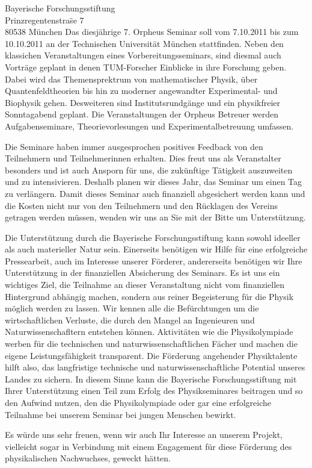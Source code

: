 \documentclass[../style/orpheus,fontsize=11pt]{scrlttr2}
\begin{document}
\begin{letter}{
\noindent Bayerische Forschungsstiftung \\
Prinzregentenstra\"se 7\\
80538 M\"unchen
}
Das diesj\"ahrige 7. Orpheus Seminar soll vom 7.10.2011 bis zum 10.10.2011 an der Technischen Universit\"at M\"unchen stattfinden. Neben den klassichen Veranstaltungen eines Vorbereitungsseminars, sind diesmal auch Vortr\"age geplant in denen TUM-Forscher Einblicke in ihre Forschung geben. Dabei wird das Themensprektrum von mathematischer Physik, \"uber Quantenfeldtheorien bis hin zu moderner angewandter Experimental- und Biophysik gehen.  Desweiteren sind Institutsrundg\"ange und ein physikfreier Sonntagabend geplant.  Die Veranstaltungen der Orpheus Betreuer werden Aufgabenseminare, Theorievorlesungen und Experimentalbetreuung umfassen.  

Die Seminare haben immer ausgesprochen positives Feedback von den Teilnehmern und Teilnehmerinnen erhalten.  Dies freut uns als Veranstalter besonders und ist auch Ansporn f\"ur uns, die zuk\"unftige T\"atigkeit auszuweiten und zu intensivieren.  Deshalb planen wir dieses Jahr, das Seminar um einen Tag zu verl\"angern.  Damit dieses Seminar auch finanziell abgesichert werden kann und die Kosten nicht nur von den Teilnehmern und den R\"ucklagen des Vereins getragen werden m\"ussen, wenden wir uns an Sie mit der Bitte um Unterst\"utzung.

Die Unterst\"utzung durch die Bayerische Forschungsstiftung kann sowohl ideeller als auch materieller Natur sein.  Einerseits ben\"otigen wir Hilfe f\"ur eine erfolgreiche Pressearbeit, auch im Interesse unserer F\"orderer,  andererseits ben\"otigen wir Ihre Unterst\"utzung in der finanziellen Absicherung des Seminars. Es ist uns ein wichtiges Ziel, die Teilnahme an dieser Veranstaltung nicht vom finanziellen Hintergrund abh\"angig machen, sondern aus reiner Begeisterung f\"ur die Physik m\"oglich werden zu lassen.  Wir kennen alle die Bef\"urchtungen um die wirtschaftlichen Verluste, die durch den Mangel an Ingenieuren und Naturwissenschafltern entstehen k\"onnen. Aktivit\"aten wie die Physikolympiade werben f\"ur die technischen und naturwissenschaftlichen F\"acher und machen die eigene Leistungsf\"ahigkeit transparent. Die F\"orderung angehender Physiktalente hilft also, das langfristige technische und naturwissenschaftliche Potential unseres Landes zu sichern. In diesem Sinne kann die Bayerische Forschungsstiftung mit Ihrer Unterst\"utzung einen Teil zum Erfolg des Physikseminares beitragen und so den Aufwind nutzen, den die Physikolympiade oder gar eine erfolgreiche Teilnahme bei unserem Seminar bei jungen Menschen bewirkt.

Es w\"urde uns sehr freuen, wenn wir auch Ihr Interesse an unserem Projekt, vielleicht sogar in Verbindung mit einem Engagement f\"ur diese F\"orderung des physikalischen Nachwuchses, geweckt h\"atten.


\end{letter}
\end{document}
